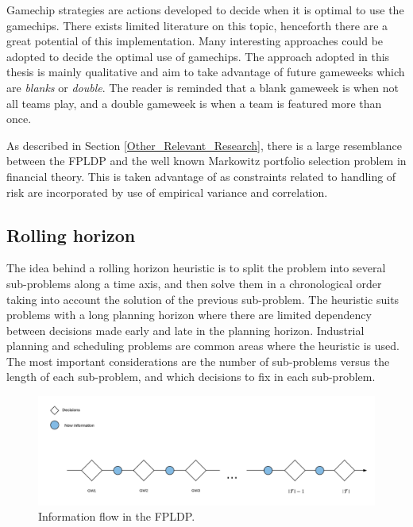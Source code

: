\newpar

Gamechip strategies are actions developed to decide when it is optimal to use the gamechips.  There exists limited literature on this topic, henceforth there are a great potential of this implementation. Many interesting approaches could be adopted to decide the optimal use of gamechips. The approach adopted in this thesis is mainly qualitative and aim to take advantage of future gameweeks which are \textit{blanks} or \textit{double}. The reader is reminded that a blank gameweek is when not all teams play, and a double gameweek is when a team is featured more than once. 

\newpar

As described in Section \ref{Other_Relevant_Research}, there is a large resemblance between the FPLDP and the well known Markowitz portfolio selection problem in financial theory. This is taken advantage of as constraints related to handling of risk are incorporated by use of empirical variance and correlation. 

\subsection{Rolling horizon}

The idea behind a rolling horizon heuristic is to split the problem into several sub-problems along a time axis, and then solve them in a chronological order taking into account the solution of the previous sub-problem. The heuristic suits problems with a long planning horizon where there are limited dependency between decisions made early and late in the planning horizon. Industrial planning and scheduling problems are common areas where the heuristic is used. The most important considerations are the number of sub-problems versus the length of each sub-problem, and which decisions to fix in each sub-problem. 

\begin{figure}[H]
    \centering
    \includegraphics[scale = 0.47]{fig/chapter_5/Rolling_Horizon_Information_Flow.png}
    \caption{Information flow in the FPLDP.}
    \label{fig:information_flow}
\end{figure}

